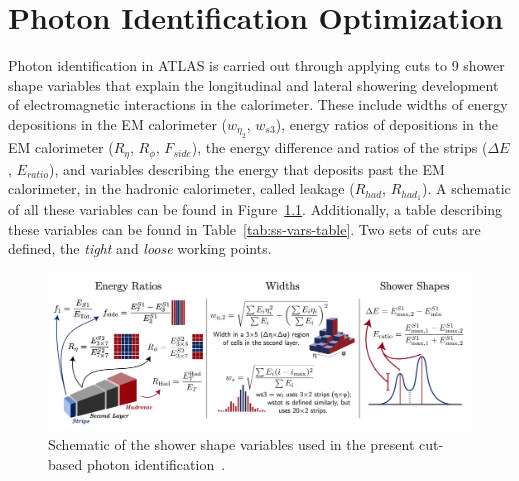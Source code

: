 \chapter{Photon Identification Optimization}

Photon identification in ATLAS is carried out through applying cuts to 9 shower shape variables that explain the longitudinal and lateral showering development of electromagnetic interactions in the calorimeter. These include widths of energy depositions in the \gls{EM} calorimeter ($w_{\eta_2}$, $w_{s3}$), energy ratios of depositions in the \gls{EM} calorimeter ($R_{\eta}$, $R_{\phi}$, $F_{side}$), the energy difference and ratios of the strips ($\Delta E$, $E_{ratio}$), and variables describing the energy that deposits past the \gls{EM} calorimeter, in the hadronic calorimeter, called leakage ($R_{had}$, $R_{had_1}$). A schematic of all these variables can be found in Figure~\ref{fig:ss-vars-schematic}. Additionally, a table describing these variables can be found in Table~\ref{tab:ss-vars-table}. Two sets of cuts are defined, the \textit{tight} and \textit{loose} working points. 

\begin{figure}
    \centering
    \includegraphics[width=.98\textwidth]{chapters/chapter4_photonID/images/ss-vars.png}
    \caption[Schematic of the shower shape variables used in the present cut-based photon identification.]
    {Schematic of the shower shape variables used in the present cut-based photon identification~\cite{ss-var-schematic}.}
    \label{fig:ss-vars-schematic}
\end{figure}

